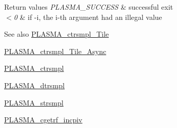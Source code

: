 \begin{DoxyRetVals}{Return values}
{\em P\+L\+A\+S\+M\+A\+\_\+\+S\+U\+C\+C\+E\+S\+S} & successful exit \\
\hline
{\em $<$0} & if -\/i, the i-\/th argument had an illegal value\\
\hline
\end{DoxyRetVals}
\begin{DoxySeeAlso}{See also}
\hyperlink{group__PLASMA__Complex32__t__Tile_ga645b798ec4a2117c05cfd095ca8b66a0_ga645b798ec4a2117c05cfd095ca8b66a0}{P\+L\+A\+S\+M\+A\+\_\+ctrsmpl\+\_\+\+Tile} 

\hyperlink{group__PLASMA__Complex32__t__Tile__Async_ga04fa557b44fcf8941804e07af0776cd6_ga04fa557b44fcf8941804e07af0776cd6}{P\+L\+A\+S\+M\+A\+\_\+ctrsmpl\+\_\+\+Tile\+\_\+\+Async} 

\hyperlink{group__PLASMA__Complex32__t_ga6f1a79fbd5420d08a1c0668c5f475f4f_ga6f1a79fbd5420d08a1c0668c5f475f4f}{P\+L\+A\+S\+M\+A\+\_\+ctrsmpl} 

\hyperlink{group__double_ga1ee42a61d4bf0294ed216add96e6ff37_ga1ee42a61d4bf0294ed216add96e6ff37}{P\+L\+A\+S\+M\+A\+\_\+dtrsmpl} 

\hyperlink{group__float_ga245da4f8540c426fde27a50eff39b64a_ga245da4f8540c426fde27a50eff39b64a}{P\+L\+A\+S\+M\+A\+\_\+strsmpl} 

\hyperlink{group__PLASMA__Complex32__t_gaaeca906ffb473a1bc1772671fb4f558f_gaaeca906ffb473a1bc1772671fb4f558f}{P\+L\+A\+S\+M\+A\+\_\+cgetrf\+\_\+incpiv} 
\end{DoxySeeAlso}
\hypertarget{group__PLASMA__Complex32__t_ga4932d66d31f7970a6cab8381d373eb12_ga4932d66d31f7970a6cab8381d373eb12}{}
